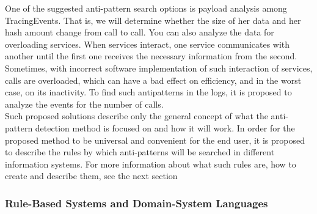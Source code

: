 \documentclass[12pt, times]{article}
\begin{document}
	\hspace*{5mm}One of the suggested anti-pattern search options is payload analysis among TracingEvents. That is, we will determine whether the size of her data and her hash amount change from call to call. You can also analyze the data for overloading services. When services interact, one service communicates with another until the first one receives the necessary information from the second. Sometimes, with incorrect software implementation of such interaction of services, calls are overloaded, which can have a bad effect on efficiency, and in the worst case, on its inactivity. To find such antipatterns in the logs, it is proposed to analyze the events for the number of calls.\\
	\hspace*{5mm}Such proposed solutions describe only the general concept of what the anti-pattern detection method is focused on and how it will work. In order for the proposed method to be universal and convenient for the end user, it is proposed to describe the rules by which anti-patterns will be searched in different information systems. For more information about what such rules are, how to create and describe them, see the next section
	
	\subsubsection{Rule-Based Systems and Domain-System Languages}
	
\end{document}
